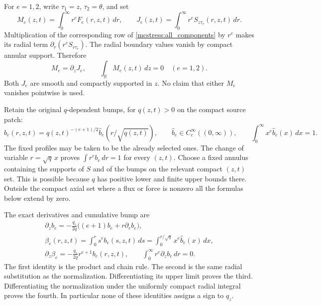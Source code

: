 For $e=1,2$, write $\tau_1=z$, $\tau_2=\theta$, and set
\begin{equation}\label{mcstress:fluxes}
 M_e(z,t)=\int_0^\infty r^eF_e(r,z,t)\,dr,
 \qquad
 J_e(z,t)=\int_0^\infty r^eS_{z\tau_e}(r,z,t)\,dr.
\end{equation}
Multiplication of the corresponding row of
\eqref{mcstress:all_components} by $r^e$ makes its radial term
$\partial_r(r^e S_{r\tau_e})$. The radial boundary values vanish
by compact annular support. Therefore
\begin{equation}\label{mcstress:flux_identity}
 M_e=\partial_zJ_e,\qquad
 \int_{\mathbb R}M_e(z,t)\,dz=0\quad(e=1,2).
\end{equation}
Both $J_e$ are smooth and compactly supported in $z$. No claim that
either $M_e$ vanishes pointwise is used.

Retain the original $q$-dependent bumps, for $q(z,t)>0$ on the compact
source patch:
\begin{equation}\label{mcstress:bumps}
 b_e(r,z,t)=q(z,t)^{-(e+1)/2}
             \widehat b_e(r/\sqrt{q(z,t)}),\qquad
 \widehat b_e\in C_c^\infty((0,\infty)),\qquad
 \int_0^\infty x^e\widehat b_e(x)\,dx=1.
\end{equation}
The fixed profiles may be taken to be the already selected ones.
The change of variable $r=\sqrt q\,x$ proves
$\int r^e b_e\,dr=1$ for every $(z,t)$. Choose a fixed annulus
containing the supports of $S$ and of the bumps on the relevant compact
$(z,t)$ set. This is possible because $q$ has positive lower and finite
upper bounds there. Outside the compact axial set where a flux or
force is nonzero all the formulas below extend by zero.

The exact derivatives and cumulative bump are
\begin{equation}\label{mcstress:bump_derivatives}
\begin{gathered}
 \partial_zb_e=-\frac{q_z}{2q}
                  \bigl((e+1)b_e+r\partial_rb_e\bigr),\\
 \beta_e(r,z,t)=\int_0^r s^eb_e(s,z,t)\,ds
              =\int_0^{r/\sqrt q}x^e\widehat b_e(x)\,dx,\\
 \partial_z\beta_e=-\frac{q_z}{2q}r^{e+1}b_e(r,z,t),\qquad
 \int_0^\infty r^e\partial_zb_e\,dr=0.
\end{gathered}
\end{equation}
The first identity is the product and chain rule. The second is the
same radial substitution as the normalization. Differentiating its
upper limit proves the third. Differentiating the normalization under
the uniformly compact radial integral proves the fourth. In particular
none of these identities assigns a sign to $q_z$.

